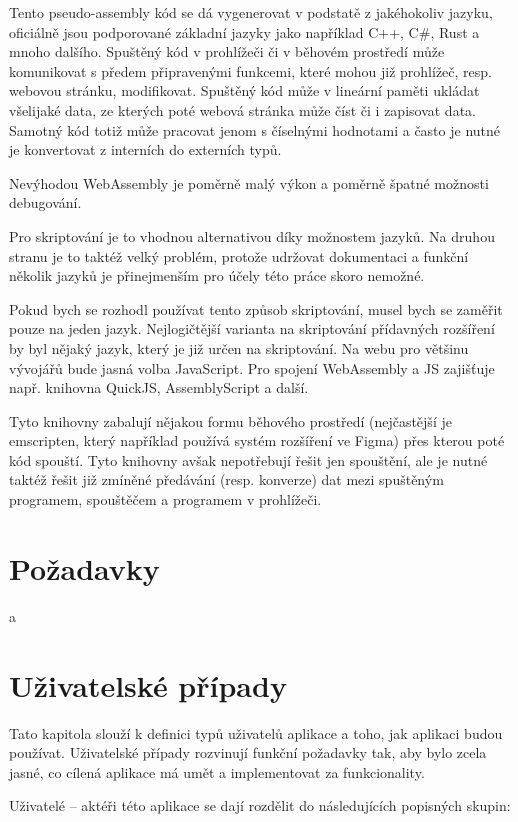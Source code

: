 Tento pseudo-assembly kód se dá vygenerovat v podstatě z jakéhokoliv jazyku, oficiálně jsou podporované základní jazyky jako například C++, C\#, Rust a mnoho dalšího.
Spuštěný kód v prohlížeči či v běhovém prostředí může komunikovat s předem připravenými funkcemi, které mohou již prohlížeč, resp. webovou stránku, modifikovat.
Spuštěný kód může v lineární paměti ukládat všelijaké data, ze kterých poté webová stránka může číst či i zapisovat data.
Samotný kód totiž může pracovat jenom s číselnými hodnotami a často je nutné je konvertovat z interních do externích typů.

Nevýhodou WebAssembly je poměrně malý výkon a poměrně špatné možnosti debugování.

Pro skriptování je to vhodnou alternativou díky možnostem jazyků. 
Na druhou stranu je to taktéž velký problém, protože udržovat dokumentaci a funkční několik jazyků je přinejmenším pro účely této práce skoro nemožné.

Pokud bych se rozhodl používat tento způsob skriptování, musel bych se zaměřit pouze na jeden jazyk.
Nejlogičtější varianta na skriptování přídavných rozšíření by byl nějaký jazyk, který je již určen na skriptování.
Na webu pro většinu vývojářů bude jasná volba JavaScript.
Pro spojení WebAssembly a JS zajišťuje např. knihovna QuickJS, AssemblyScript a další.

Tyto knihovny zabalují nějakou formu běhového prostředí (nejčastější je emscripten, který například používá systém rozšíření ve Figma) přes kterou poté kód spouští.
Tyto knihovny avšak nepotřebují řešit jen spouštění, ale je nutné taktéž řešit již zmíněné předávání (resp. konverze) dat mezi spuštěným programem, spouštěčem a programem v prohlížeči.


\section{Požadavky}
a

\section{Uživatelské případy}

Tato kapitola slouží k definici typů uživatelů aplikace a toho, jak aplikaci budou používat.
Uživatelské případy rozvinují funkční požadavky tak, aby bylo zcela jasné, co cílená aplikace má umět a implementovat za funkcionality.

Uživatelé -- aktéři této aplikace se dají rozdělit do následujících popisných skupin:

